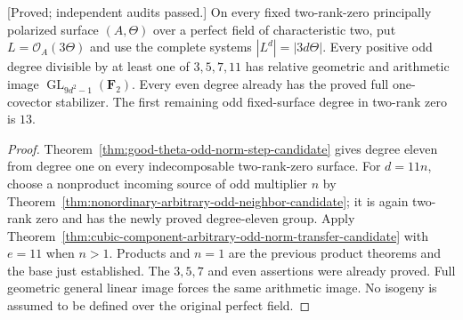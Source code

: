 \begin{corollary}
\label{cor:f0-odd-multiples-eleven-candidate}
\textup{[Proved; independent audits passed.]}
On every fixed two-rank-zero principally polarized surface $(A,\Theta)$
over a perfect field of characteristic two, put $L=\mathcal O_A(3\Theta)$
and use the complete systems $|L^d|=|3d\Theta|$. Every positive odd
degree divisible by at
least one of $3,5,7,11$ has relative geometric and arithmetic image
$\operatorname{GL}_{9d^2-1}(\mathbf F_2)$. Every even degree already
has the proved full one-covector stabilizer. The first remaining odd
fixed-surface degree in two-rank zero is $13$.
\end{corollary}
\begin{proof}
Theorem~\ref{thm:good-theta-odd-norm-step-candidate} gives degree eleven
from degree one on every
indecomposable two-rank-zero surface. For $d=11n$, choose a nonproduct
incoming source of odd multiplier $n$ by
Theorem~\ref{thm:nonordinary-arbitrary-odd-neighbor-candidate}; it is
again two-rank zero and has the newly proved degree-eleven group.
Apply Theorem~\ref{thm:cubic-component-arbitrary-odd-norm-transfer-candidate}
with $e=11$ when $n>1$. Products and $n=1$ are the previous product
theorems and the base just established. The $3,5,7$ and even assertions
were already proved. Full geometric general linear image forces the
same arithmetic image. No isogeny is assumed to be defined over the
original perfect field.
\end{proof}

